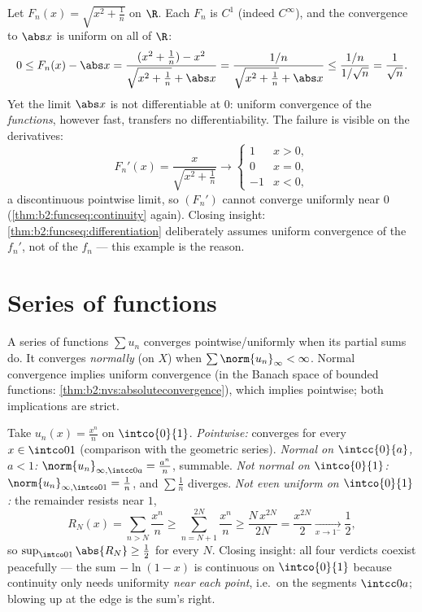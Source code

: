 \begin{example}\label{ex:b2:funcseq:sqrtabs}
Let $F_n(x) = \sqrt{x^2 + \frac1n}$ on $\R$. Each $F_n$ is
$C^1$ (indeed $C^\infty$), and the convergence to $\abs x$ is
uniform on all of $\R$:
\[
0 \leq F_n(x) - \abs x
= \frac{(x^2 + \frac1n) - x^2}{\sqrt{x^2+\frac1n} + \abs x}
= \frac{1/n}{\sqrt{x^2 + \frac1n} + \abs x}
\leq \frac{1/n}{1/\sqrt n} = \frac{1}{\sqrt n} .
\]
Yet the limit $\abs x$ is not differentiable at $0$: uniform
convergence of the \emph{functions}, however fast, transfers no
differentiability. The failure is visible on the derivatives:
\[
F_n'(x) = \frac{x}{\sqrt{x^2 + \frac1n}}
\longrightarrow \begin{cases} 1 & x > 0,\\ 0 & x = 0,\\
-1 & x < 0, \end{cases}
\]
a discontinuous pointwise limit, so $(F_n')$ cannot converge
uniformly near $0$ (\cref{thm:b2:funcseq:continuity} again).
Closing insight:
\cref{thm:b2:funcseq:differentiation} deliberately assumes
uniform convergence of the $f_n'$, not of the $f_n$ ---
this example is the reason.
\end{example}

\section{Series of functions}

\begin{definition}\label{def:b2:funcseq:series}
A series of functions $\sum u_n$ converges pointwise/uniformly when
its partial sums do. It converges
\emph{normally} (on $X$) when $\sum
\norm{u_n}_\infty < \infty$. Normal convergence implies uniform
convergence (in the Banach space of bounded functions:
\cref{thm:b2:nvs:absoluteconvergence}), which implies pointwise;
both implications are strict.
\end{definition}

\begin{example}\label{ex:b2:funcseq:threemodes}
Take $u_n(x) = \frac{x^n}{n}$ on $\intco{0}{1}$. \emph{Pointwise:}
converges for every $x \in \intco01$ (comparison with the
geometric series). \emph{Normal on $\intcc{0}{a}$, $a < 1$:}
$\norm{u_n}_{\infty,\intcc0a} = \frac{a^n}{n}$, summable.
\emph{Not normal on $\intco{0}{1}$:}
$\norm{u_n}_{\infty,\intco01} = \frac1n$, and $\sum\frac1n$
diverges. \emph{Not even uniform on $\intco{0}{1}$:} the
remainder resists near $1$,
\[
R_N(x) = \sum_{n>N}\frac{x^n}{n}
\geq \sum_{n=N+1}^{2N}\frac{x^n}{n}
\geq \frac{N\,x^{2N}}{2N} = \frac{x^{2N}}{2}
\xrightarrow[x\to1^-]{} \frac12 ,
\]
so $\sup_{\intco01}\abs{R_N} \geq \frac12$ for every $N$.
Closing insight: all four verdicts coexist peacefully --- the
sum $-\ln(1-x)$ is continuous on $\intco{0}{1}$ because
continuity only needs uniformity \emph{near each point}, i.e.\
on the segments $\intcc0a$; blowing up at the edge is the
sum's right.
\end{example}

